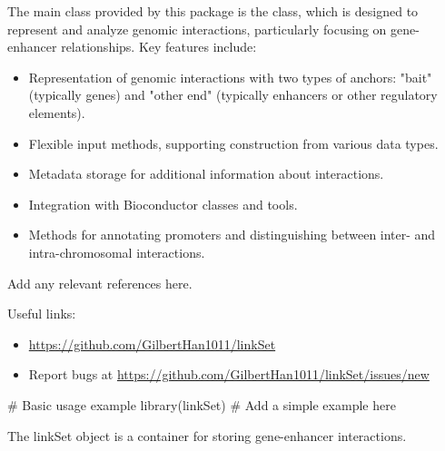 \documentclass[letterpaper]{book}
\begin{document}
%
\begin{Details}
The main class provided by this package is the  class, which is
designed to represent and analyze genomic interactions, particularly
focusing on gene-enhancer relationships. Key features include:

\begin{itemize}

\item{} Representation of genomic interactions with two types of anchors:
"bait" (typically genes) and "other end" (typically enhancers or
other regulatory elements).
\item{} Flexible input methods, supporting construction from various data types.
\item{} Metadata storage for additional information about interactions.
\item{} Integration with Bioconductor classes and tools.
\item{} Methods for annotating promoters and distinguishing between inter-
and intra-chromosomal interactions.

\end{itemize}

\end{Details}
%
\begin{References}
Add any relevant references here.
\end{References}
%
\begin{SeeAlso}
Useful links:
\begin{itemize}

\item{} \url{https://github.com/GilbertHan1011/linkSet}
\item{} Report bugs at \url{https://github.com/GilbertHan1011/linkSet/issues/new}

\end{itemize}

\end{SeeAlso}
%
\begin{Examples}
\begin{ExampleCode}
# Basic usage example
library(linkSet)
# Add a simple example here

\end{ExampleCode}
\end{Examples}
%
\begin{Description}
The linkSet object is a container for storing gene-enhancer interactions.
\end{Description}
\end{document}
